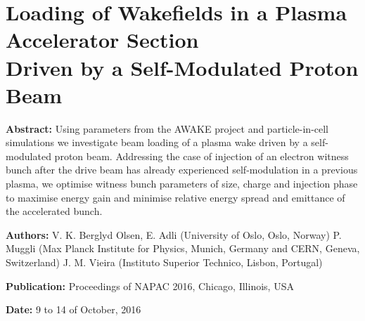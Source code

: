 %
%

\chapter{Loading of Wakefields in a Plasma Accelerator Section\\
         Driven by a Self-Modulated Proton Beam}
\label{Pub:NAPAC16}

\begin{hangparas}{10mm}{1}

    \textbf{Abstract:}
    Using parameters from the AWAKE project and particle-in-cell simulations we
    investigate beam loading of a plasma wake driven by a self-modulated proton beam.
    Addressing the case of injection of an electron witness bunch after the drive beam
    has already experienced self-modulation in a previous plasma, we optimise witness
    bunch parameters of size, charge and injection phase to maximise energy gain and
    minimise relative energy spread and emittance of the accelerated bunch.

    \vspace{5mm}

    \textbf{Authors:}
    V. K. Berglyd Olsen, E. Adli (University of Oslo, Oslo, Norway)
    P. Muggli (Max Planck Institute for Physics, Munich, Germany
               and CERN, Geneva, Switzerland)
    J. M. Vieira (Instituto Superior Technico, Lisbon, Portugal)

    \vspace{5mm}

    \textbf{Publication:}
    Proceedings of NAPAC 2016, Chicago, Illinois, USA

    \vspace{5mm}

    \textbf{Date:} 9 to 14 of October, 2016


\end{hangparas}
